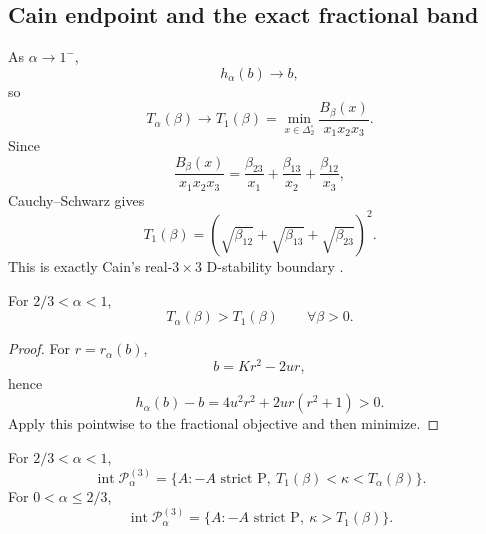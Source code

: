 \subsection{Cain endpoint and the exact fractional band}

As \(\alpha\to1^-\),
\[
h_\alpha(b)\to b,
\]
so
\[
T_\alpha(\beta)\to
T_1(\beta)
=
\min_{x\in\Delta_2^\circ}
\frac{B_\beta(x)}{x_1x_2x_3}.
\]
Since
\[
\frac{B_\beta(x)}{x_1x_2x_3}
=
\frac{\beta_{23}}{x_1}
+\frac{\beta_{13}}{x_2}
+\frac{\beta_{12}}{x_3},
\]
Cauchy--Schwarz gives
\[
\boxed{
T_1(\beta)
=
\left(
\sqrt{\beta_{12}}
+\sqrt{\beta_{13}}
+\sqrt{\beta_{23}}
\right)^2.
}
\]
This is exactly Cain's real-\(3\times3\) D-stability boundary \citep{Cain1976}.

\begin{lemma}
\label{lem:Talpha-gt-T1}
For \(2/3<\alpha<1\),
\[
T_\alpha(\beta)>T_1(\beta)
\qquad
\forall\beta>0.
\]
\end{lemma}

\begin{proof}
For \(r=r_\alpha(b)\),
\[
b=Kr^2-2ur,
\]
hence
\[
h_\alpha(b)-b
=
4u^2r^2+2ur(r^2+1)>0.
\]
Apply this pointwise to the fractional objective and then minimize.
\end{proof}

\begin{corollary}
\label{cor:exact-band}
For \(2/3<\alpha<1\),
\[
\boxed{
\operatorname{int}\mathcal P_\alpha^{(3)}
=
\{A:-A\text{ strict P},\
T_1(\beta)<\kappa<T_\alpha(\beta)\}.
}
\]
For \(0<\alpha\le2/3\),
\[
\boxed{
\operatorname{int}\mathcal P_\alpha^{(3)}
=
\{A:-A\text{ strict P},\ \kappa>T_1(\beta)\}.
}
\]
\end{corollary}
